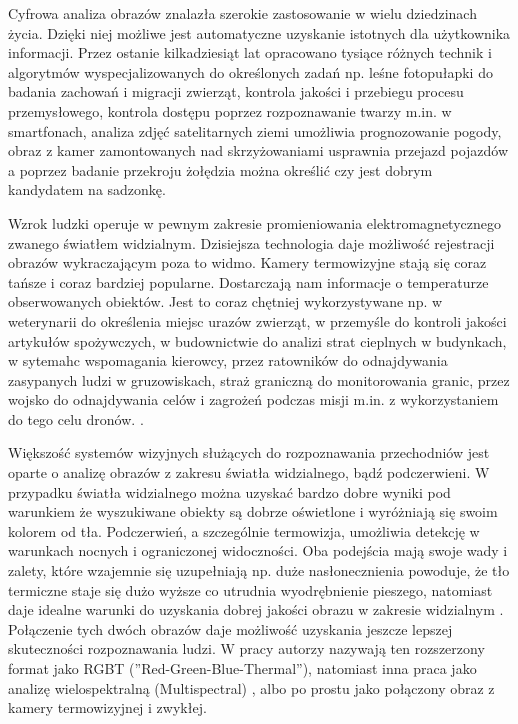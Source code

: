 Cyfrowa analiza obrazów znalazła szerokie zastosowanie w wielu dziedzinach życia. Dzięki niej możliwe jest automatyczne uzyskanie istotnych dla użytkownika informacji. Przez ostanie kilkadziesiąt lat opracowano tysiące różnych technik i algorytmów wyspecjalizowanych do określonych zadań np. leśne fotopułapki do badania zachowań i migracji zwierząt, kontrola jakości i przebiegu procesu przemysłowego, kontrola dostępu poprzez rozpoznawanie twarzy m.in. w smartfonach, analiza zdjęć satelitarnych ziemi umożliwia prognozowanie pogody, obraz z kamer zamontowanych nad skrzyżowaniami usprawnia przejazd pojazdów a poprzez badanie przekroju żołędzia można określić czy jest dobrym kandydatem na sadzonkę. 

Wzrok ludzki operuje w pewnym zakresie promieniowania elektromagnetycznego zwanego światłem widzialnym. Dzisiejsza technologia daje możliwość rejestracji obrazów wykraczającym poza to widmo. Kamery termowizyjne stają się coraz tańsze i coraz bardziej popularne. Dostarczają nam informacje o temperaturze obserwowanych obiektów. Jest to coraz chętniej wykorzystywane np. w weterynarii do określenia miejsc urazów zwierząt, w przemyśle do kontroli jakości artykułów spożywczych, w budownictwie do analizi strat cieplnych w budynkach, w sytemahc wspomagania kierowcy, przez ratowników do odnajdywania zasypanych ludzi w gruzowiskach, straż graniczną do monitorowania granic, przez wojsko do odnajdywania celów i zagrożeń podczas misji m.in. z wykorzystaniem do tego celu dronów. \cite{gade2014thermal}. 

Większość systemów wizyjnych służących do rozpoznawania przechodniów jest oparte o analizę obrazów z zakresu światła widzialnego, bądź podczerwieni. 
W przypadku światła widzialnego można uzyskać bardzo dobre wyniki pod warunkiem że wyszukiwane obiekty są dobrze oświetlone i wyróżniają się swoim kolorem od tła. 
Podczerwień, a szczególnie termowizja, umożliwia detekcję w warunkach nocnych i ograniczonej widoczności.
Oba podejścia mają swoje wady i zalety, które wzajemnie się uzupełniają np. duże nasłonecznienia powoduje, że tło termiczne staje się dużo wyższe co utrudnia wyodrębnienie pieszego, natomiast daje idealne warunki do uzyskania dobrej jakości obrazu w zakresie widzialnym \cite{lee2015robust}. 
Połączenie tych dwóch obrazów daje możliwość uzyskania jeszcze lepszej skuteczności rozpoznawania ludzi. W pracy \cite{st2007combination} autorzy nazywają ten rozszerzony format jako RGBT (''Red-Green-Blue-Thermal''), natomiast inna praca jako analizę wielospektralną (Multispectral) \cite{hwang2015multispectral}, albo po prostu jako połączony obraz z kamery termowizyjnej i zwykłej\cite{lee2015robust}. 

